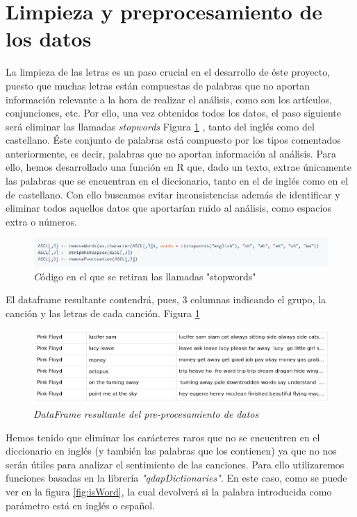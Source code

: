 \section{Limpieza y preprocesamiento de los datos}
La limpieza de las letras es un paso crucial en el desarrollo de éste proyecto, puesto que muchas letras están compuestas de palabras que no aportan información relevante a la hora de realizar el análisis, como son los artículos, conjunciones, etc. Por ello, una vez obtenidos todos los datos, el paso siguiente será eliminar las llamadas \textit{stopwords} Figura \ref{fig:removeStopWords} , tanto del inglés como del castellano. Éste conjunto de palabras está compuesto por los tipos comentados anteriormente, es decir, palabras que no aportan información al análisis. Para ello, hemos desarrollado una función en R que, dado un texto, extrae únicamente las palabras que se encuentran en el diccionario, tanto en el de inglés como en el de castellano. Con ello buscamos evitar inconsistencias además de identificar y eliminar todos aquellos datos que aportarían ruido al análisis, como espacios extra o números.

\begin{figure}[h]
	\centering
	\includegraphics[width=1\linewidth]{Imagenes/removeStopWords}
	\caption{\textit Código en el que se retiran las llamadas "stopwords"}
	\label{fig:removeStopWords}
\end{figure}

El dataframe resultante contendrá, pues, 3 columnas indicando el grupo, la canción y las letras de cada canción. Figura \ref{fig:removeStopWords}

\begin{figure}[h]
	\centering
	\includegraphics[width=1\linewidth]{Imagenes/datasetDataCleaning}
	\caption{\textit{DataFrame resultante del pre-procesamiento de datos}}
	\label{fig:datasetDataCleaning}
\end{figure}

Hemos tenido que eliminar los carácteres raros que no se encuentren en el diccionario en inglés (y también las palabras que los contienen) ya que no nos serán útiles para analizar el sentimiento de las canciones. Para ello utilizaremos funciones basadas en la librería  \textit{"qdapDictionaries"}. En este caso, como se puede ver en la figura \ref{fig:isWord}, la cual devolverá si la palabra introducida como parámetro está en inglés o español.

